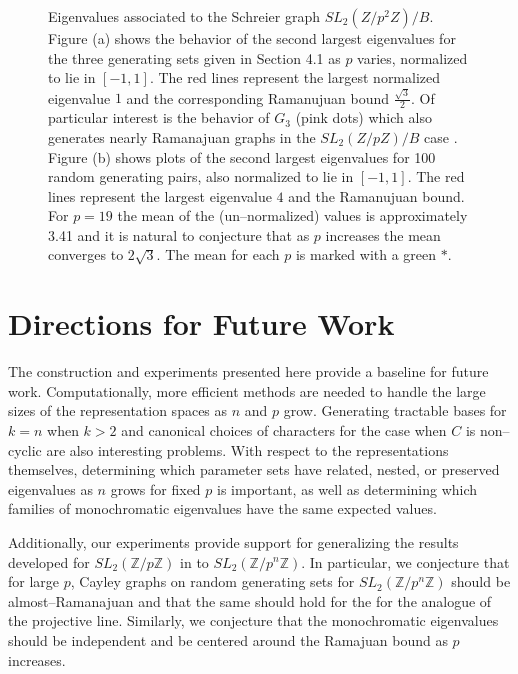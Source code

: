 \documentclass[12pt,reqno]{amsart}
\theoremstyle{remark}
\numberwithin{table}{section}
\begin{document}
\begin{figure}[!h] 
\label{fig:GmodB}
\qquad
{}
\caption{Eigenvalues associated to the Schreier graph $SL_2(Z/p^2Z)/B$. Figure (a) shows the behavior of the second largest eigenvalues for the three generating sets given in Section 4.1 as $p$ varies, normalized to lie in $[-1,1]$. The red lines represent the largest normalized eigenvalue $1$ and the corresponding Ramanujuan bound $\frac{\sqrt{3}}{2}$. Of particular interest is the behavior of $G_3$ (pink dots) which also generates nearly Ramanajuan graphs in the $SL_2(Z/pZ)/B$ case \cite{RS}. Figure (b) shows plots of the second largest eigenvalues for 100 random generating pairs, also  normalized to lie in $[-1,1]$. The red lines represent the largest eigenvalue $4$ and the Ramanujuan bound. For $p=19$ the mean of the (un--normalized) values is approximately 3.41 and it is natural to conjecture that as $p$ increases the mean converges to $2\sqrt{3}$. The mean for each $p$ is marked with a green $*$.   }
\end{figure}


\section{Directions for Future Work}
The construction and experiments presented here provide a baseline for future work. Computationally, more efficient methods are needed to handle the large sizes of the representation spaces as $n$ and $p$ grow. Generating tractable bases for $k=n$ when $k>2$ and canonical choices of characters for the case when $C$ is non--cyclic are also interesting problems. With respect to the representations themselves, determining which parameter sets have related, nested, or preserved eigenvalues as $n$ grows for fixed $p$ is important, as well as determining which families of monochromatic eigenvalues have the same expected values. 




Additionally, our experiments provide support for generalizing the results developed for $SL_2(\mathbb{Z}/p\mathbb{Z})$ in \cite{RS} to $SL_2(\mathbb{Z}/p^n\mathbb{Z})$. In particular, we conjecture that for large $p$, Cayley graphs on random generating sets for $SL_2(\mathbb{Z}/p^n\mathbb{Z})$ should be almost--Ramanajuan and that the same should hold for the for the analogue of the projective line. Similarly, we conjecture that the monochromatic eigenvalues should be independent and be centered around the Ramajuan bound  as $p$ increases. 
\end{document}
